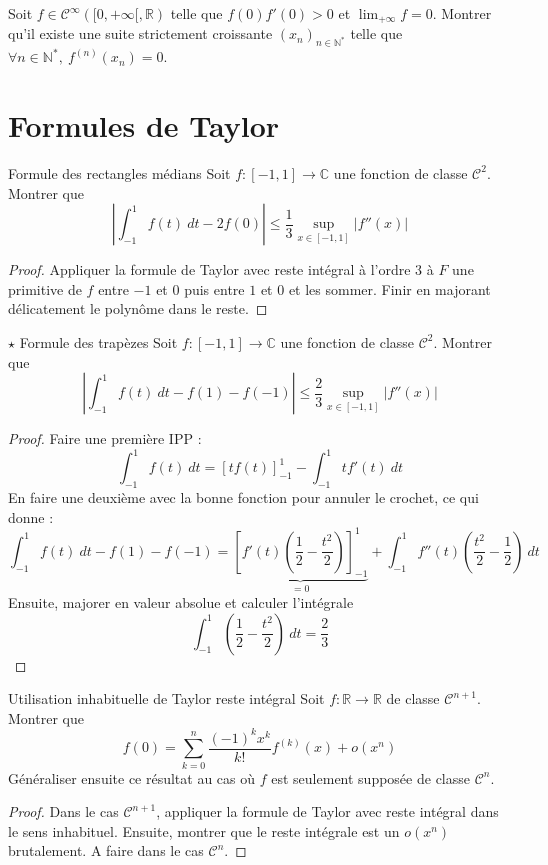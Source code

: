 \documentclass[french,a4paper]{article}
\newcommand{\N}{\mathbb{N}}
\newcommand{\R}{\mathbb{R}}
\newcommand{\C}{\mathbb{C}}
\newcommand{\st}{^*}
\theoremstyle{plain}
\theoremstyle{definition}
\theoremstyle{remark}
\begin{document}
\begin{ex}[Moulin.FV.20]{}
	Soit $f\in\mathcal{C}^{\infty}([0,+\infty[,\R)$ telle que $f(0)f'(0)>0$ et $\lim_{+\infty}f=0$. Montrer qu'il existe une suite strictement croissante $(x_n)_{n\in\N\st}$ telle que $\forall n\in\N\st,\ f^{(n)}(x_n)=0$.
\end{ex}

\section{Formules de Taylor}

\begin{ex}[Moulin.FV.21]{Formule des rectangles médians}
	Soit $f:[-1,1]\to\C$ une fonction de classe $\mathcal{C}^2$. Montrer que $$\left\lvert\int_{-1}^{1}f(t)\ dt-2f(0)\right\rvert\leqslant\frac{1}{3}\underset{x\in[-1,1]}{\sup}\lvert f''(x)\rvert$$
\end{ex}
\begin{proof}
	Appliquer la formule de Taylor avec reste intégral à l'ordre $3$ à $F$ une primitive de $f$ entre $-1$ et $0$ puis entre $1$ et $0$ et les sommer. Finir en majorant délicatement le polynôme dans le reste.
\end{proof}

\begin{ex}[Moulin.FV.22]{$\star$ Formule des trapèzes}
	Soit $f:[-1,1]\to\C$ une fonction de classe $\mathcal{C}^2$. Montrer que $$\left\lvert\int_{-1}^{1}f(t)\ dt-f(1)-f(-1)\right\rvert\leqslant\frac{2}{3}\underset{x\in[-1,1]}{\sup}\lvert f''(x)\rvert$$
\end{ex}
\begin{proof}
	Faire une première IPP : $$\int_{-1}^{1}f(t)\ dt=\left[tf(t)\right]_{-1}^1-\int_{-1}^{1}tf'(t)\ dt$$ En faire une deuxième avec la bonne fonction pour annuler le crochet, ce qui donne : $$\int_{-1}^{1}f(t)\ dt-f(1)-f(-1)=\underbrace{\left[f'(t)\left(\frac{1}{2}-\frac{t^2}{2}\right)\right]_{-1}^1}_{=0}+\int_{-1}^{1}f''(t)\left(\frac{t^2}{2}-\frac{1}{2}\right)\ dt$$ Ensuite, majorer en valeur absolue et calculer l'intégrale $$\int_{-1}^{1}\left(\frac{1}{2}-\frac{t^2}{2}\right)\ dt=\frac{2}{3}$$
\end{proof}

\begin{ex}[Moulin.FV.23]{Utilisation inhabituelle de Taylor reste intégral}
	Soit $f:\R\to\R$ de classe $\mathcal{C}^{n+1}$. Montrer que $$f(0)=\sum_{k=0}^{n}\frac{(-1)^kx^k}{k!}f^{(k)}(x)+o(x^n)$$ Généraliser ensuite ce résultat au cas où $f$ est seulement supposée de classe $\mathcal{C}^{n}$.
\end{ex}
\begin{proof}
	Dans le cas $\mathcal{C}^{n+1}$, appliquer la formule de Taylor avec reste intégral dans le sens inhabituel. Ensuite, montrer que le reste intégrale est un $o(x^n)$ brutalement. A faire dans le cas $\mathcal{C}^n$.
\end{proof}
\end{document}
